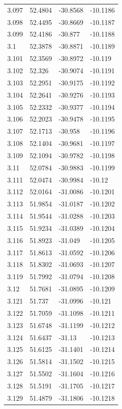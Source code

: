 \begin{tabular}{llll}
3.097 & 52.4804 & -30.8568 & -10.1186 \\
3.098 & 52.4495 & -30.8669 & -10.1187 \\
3.099 & 52.4186 & -30.877 & -10.1188 \\
3.1 & 52.3878 & -30.8871 & -10.1189 \\
3.101 & 52.3569 & -30.8972 & -10.119 \\
3.102 & 52.326 & -30.9074 & -10.1191 \\
3.103 & 52.2951 & -30.9175 & -10.1192 \\
3.104 & 52.2641 & -30.9276 & -10.1193 \\
3.105 & 52.2332 & -30.9377 & -10.1194 \\
3.106 & 52.2023 & -30.9478 & -10.1195 \\
3.107 & 52.1713 & -30.958 & -10.1196 \\
3.108 & 52.1404 & -30.9681 & -10.1197 \\
3.109 & 52.1094 & -30.9782 & -10.1198 \\
3.11 & 52.0784 & -30.9883 & -10.1199 \\
3.111 & 52.0474 & -30.9984 & -10.12 \\
3.112 & 52.0164 & -31.0086 & -10.1201 \\
3.113 & 51.9854 & -31.0187 & -10.1202 \\
3.114 & 51.9544 & -31.0288 & -10.1203 \\
3.115 & 51.9234 & -31.0389 & -10.1204 \\
3.116 & 51.8923 & -31.049 & -10.1205 \\
3.117 & 51.8613 & -31.0592 & -10.1206 \\
3.118 & 51.8302 & -31.0693 & -10.1207 \\
3.119 & 51.7992 & -31.0794 & -10.1208 \\
3.12 & 51.7681 & -31.0895 & -10.1209 \\
3.121 & 51.737 & -31.0996 & -10.121 \\
3.122 & 51.7059 & -31.1098 & -10.1211 \\
3.123 & 51.6748 & -31.1199 & -10.1212 \\
3.124 & 51.6437 & -31.13 & -10.1213 \\
3.125 & 51.6125 & -31.1401 & -10.1214 \\
3.126 & 51.5814 & -31.1502 & -10.1215 \\
3.127 & 51.5502 & -31.1604 & -10.1216 \\
3.128 & 51.5191 & -31.1705 & -10.1217 \\
3.129 & 51.4879 & -31.1806 & -10.1218 \\

\end{tabular}
